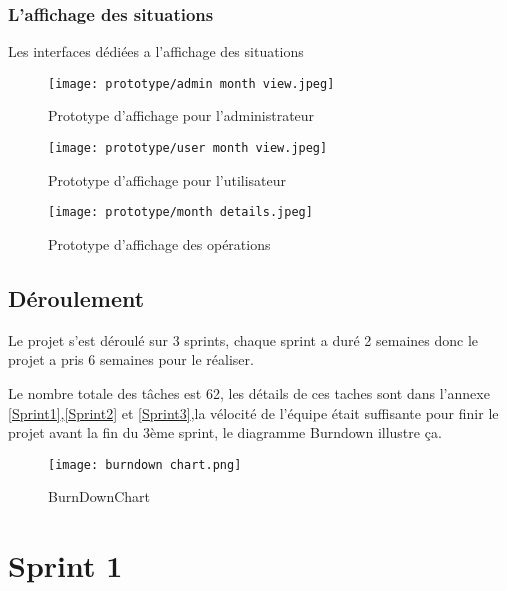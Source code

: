 \subsubsection{L'affichage des situations}
Les interfaces dédiées a l'affichage des situations
\begin{figure}[h!]
    \begin{minipage}[t]{0.25\textwidth}    %
            \texttt{[image: prototype/admin month view.jpeg]}
            \caption{ Prototype d'affichage pour l'administrateur}
      \end{minipage}%
      \begin{minipage}{0.10\textwidth}
        \hfill
      \end{minipage}
    \begin{minipage}[t]{0.25\textwidth}
            \texttt{[image: prototype/user month view.jpeg]}
            \caption{ Prototype d'affichage pour l'utilisateur}
    \end{minipage}%
    \begin{minipage}{0.10\textwidth}
        \hfill
    \end{minipage}
      \begin{minipage}[t]{0.25\textwidth}
            \texttt{[image: prototype/month details.jpeg]}
            \caption{ Prototype d'affichage des opérations}
    \end{minipage}
    \end{figure}
    \newpage
    \subsection{Déroulement}
    Le projet s'est déroulé sur 3 sprints, chaque sprint a duré 2 semaines donc le projet a pris 6 semaines pour le réaliser.
    
    
    
    Le nombre totale des tâches est 62, les détails de ces taches sont dans l'annexe \autoref{Sprint1},\autoref{Sprint2} et \autoref{Sprint3},la vélocité de l'équipe était suffisante pour finir le projet avant la fin du 3ème sprint, le diagramme Burndown illustre ça.
    \begin{figure}[h]
      \centering
      \texttt{[image: burndown chart.png]}
      \caption{BurnDownChart}
  \end{figure}


\section{Sprint 1}
